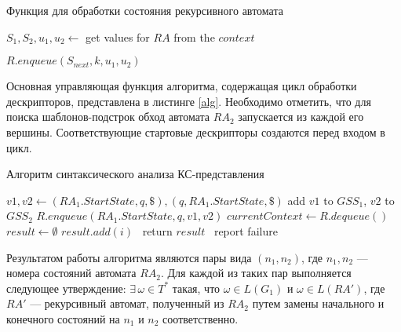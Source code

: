 \begin{algorithm}[H]
\begin{algorithmic}
\caption{Функция для обработки состояния рекурсивного автомата}
	\State $S_1, S_2, u_1, u_2 \gets$ get values for $RA$ from the $context$
			\State {}
		\EndIf
	
						\State {}
					\EndIf
						\State {}
					\Else
						\State $R.enqueue(S_{next}, k, u_1, u_2)$
					\EndIf
				\EndFor
			\EndCase
			
				\State {}
			\EndCase
			\EndSwitch
		\EndFor
\EndFunction
\end{algorithmic}
\end{algorithm}

Основная управляющая функция алгоритма, содержащая цикл обработки дескрипторов, представлена в листинге \ref{alg}. Необходимо отметить, что для поиска шаблонов-подстрок обход автомата $RA_2$ запускается из каждой его вершины. Соответствующие стартовые дескрипторы создаются перед входом в цикл.

\begin{algorithm}[H]
\begin{algorithmic}
\caption{Алгоритм синтаксического анализа КС-представления}
		\State $v1, v2 \gets (RA_1.StartState, q, \$), (q, RA_1.StartState, \$)$
		\State add $v1$ to $GSS_1$, $v2$ to $GSS_2$
		\State $R.enqueue(RA_1.StartState, q, v1, v2)$
	\EndFor
		\State $currentContext \gets R.dequeue()$
		\State {}
		\State {}
	\EndWhile
	\State $result \gets \emptyset$
	\State $result.add(i)$
	\EndFor
	\ return $result$
	\Else
	\ report failure
	\EndIf
\EndFunction
\label{alg}
\end{algorithmic}
\end{algorithm}

Результатом работы алгоритма являются пары вида $(n_1, n_2)$, где $n_1, n_2$ --- номера состояний автомата $RA_2$. 
Для каждой из таких пар выполняется следующее утверждение: $\exists \, \omega \in T^*$ такая, что $\omega \in L(G_1)$ и $\omega \in L(RA')$, где $RA'$ --- рекурсивный автомат, полученный из $RA_2$ путем замены начального и конечного состояний на $n_1$ и $n_2$ соответственно.

\pagebreak
